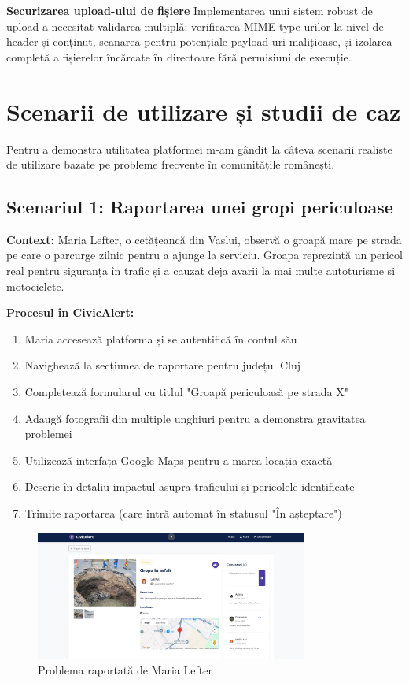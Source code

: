 \documentclass[12pt,a4paper]{report}
\begin{document}
\textbf{Securizarea upload-ului de fișiere}
Implementarea unui sistem robust de upload a necesitat validarea multiplă: verificarea MIME type-urilor la nivel de header și conținut, scanarea pentru potențiale payload-uri malițioase, și izolarea completă a fișierelor încărcate în directoare fără permisiuni de execuție.

\section{Scenarii de utilizare și studii de caz}

Pentru a demonstra  utilitatea platformei m-am gândit la câteva scenarii realiste de utilizare bazate pe probleme frecvente în comunitățile românești.

\subsection{Scenariul 1: Raportarea unei gropi periculoase}

\textbf{Context:} Maria Lefter, o cetățeancă din Vaslui, observă o groapă mare pe strada pe care o parcurge zilnic pentru a ajunge la serviciu. Groapa reprezintă un pericol real pentru siguranța în trafic și a cauzat deja avarii la mai multe autoturisme si motociclete.

\textbf{Procesul în CivicAlert:}
\begin{enumerate}
\item Maria accesează platforma și se autentifică în contul său
\item Navighează la secțiunea de raportare pentru județul Cluj
\item Completează formularul cu titlul "Groapă periculoasă pe strada X"
\item Adaugă fotografii din multiple unghiuri pentru a demonstra gravitatea problemei
\item Utilizează interfața Google Maps pentru a marca locația exactă
\item Descrie în detaliu impactul asupra traficului și pericolele identificate
\item Trimite raportarea (care intră automat în statusul "În așteptare")
\end{enumerate}

\begin{figure}[H]
    \centering
    \includegraphics[width=0.8\textwidth]{groapa in asfalt.png}
    \caption{Problema raportată de Maria Lefter}
    \label{fig:groapa}
\end{figure}
\end{document}
